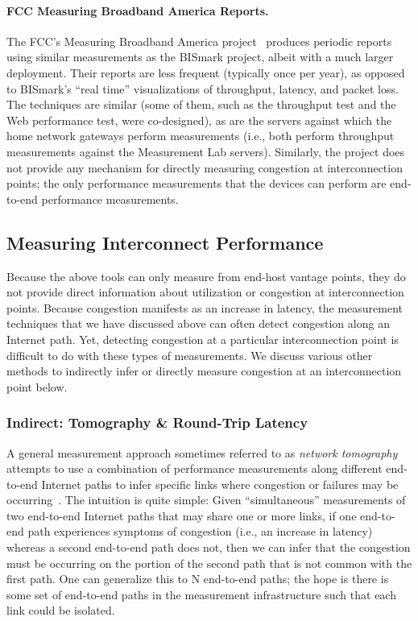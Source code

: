 \paragraph{FCC Measuring Broadband America Reports.} The FCC’s Measuring
Broadband America project~\cite{www-mba} produces periodic reports using similar measurements
as the BISmark project, albeit with a much larger deployment. Their
reports are less frequent (typically once per year), as opposed to
BISmark's ``real time'' visualizations of throughput, latency, and packet
loss. The techniques are similar (some of them, such as the
throughput test and the Web performance test, were co-designed), as are
the servers against which the home network gateways perform measurements
(i.e., both perform throughput measurements against the Measurement Lab
servers). Similarly, the project does not provide any mechanism for
directly measuring congestion at interconnection points; the only
performance measurements that the devices can perform are end-to-end
performance measurements. 

\subsection{Measuring Interconnect Performance}

Because the above tools can only measure from end-host vantage points,
they do not provide direct information about utilization or congestion
at interconnection points. Because congestion manifests as an
increase in latency, the measurement techniques that we have discussed
above can often detect congestion along an Internet path. Yet, detecting
congestion at a particular interconnection point is difficult to do with
these types of measurements. We discuss various other methods to
indirectly infer or directly measure congestion at an interconnection
point below.

\subsubsection{Indirect: Tomography \& Round-Trip Latency}

A general measurement approach sometimes referred to as {\em network
tomography} attempts to use a combination of performance measurements
along different end-to-end Internet paths to infer specific links where
congestion or failures may be occurring~\cite{coates2001network}. The intuition is quite simple:
Given ``simultaneous'' measurements of two end-to-end Internet paths that
may share one or more links, if one end-to-end path experiences symptoms
of congestion (i.e., an increase in latency) whereas a second end-to-end
path does not, then we can infer that the congestion must be occurring
on the portion of the second path that is not common with the first
path. One can generalize this to N end-to-end paths; the hope is there
is some set of end-to-end paths in the measurement infrastructure such
that each link could be isolated.  

